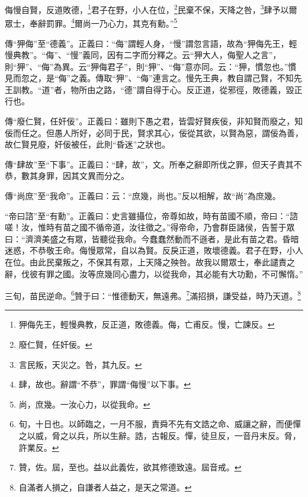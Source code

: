 侮慢自賢，反道敗德，\footnote{狎侮先王，輕慢典教，反正道，敗德義。侮，亡甫反。慢，亡諫反。}君子在野，小人在位，\footnote{廢仁賢，任奸佞。}民棄不保，天降之咎，\footnote{言民叛，天災之。咎，其九反。}肆予以爾眾士，奉辭罰罪。\footnote{肆，故也。辭謂“不恭”，罪謂“侮慢”以下事。}爾尚一乃心力，其克有勳。”\footnote{尚，庶幾。一汝心力，以從我命。}

{\noindent\zhuan{}\fzbyks 傳“狎侮”至“德義”。正義曰：“侮”謂輕人身，“慢”謂忽言語，故為“狎侮先王，輕慢典教”。“侮”、“慢”義同，因有二字而分釋之。云“狎大人，侮聖人之言”，則“狎”、“侮”為異。云“狎侮君子”，則“狎”、“侮”意亦同。云：“狎，慣忽也。”慣見而忽之，是“侮”之義。傳取“狎”、“侮”連言之。慢先王典，教自謂己賢，不知先王訓教。“道”者，物所由之路，“德”謂自得于心。反正道，從邪徑，敗德義，毀正行也。 \par}

{\noindent\zhuan{}\fzbyks 傳“廢仁賢，任奸佞”。正義曰：雖則下愚之君，皆雲好賢疾佞，非知賢而廢之，知佞而任之。但愚人所好，必同于民，賢求其心，佞從其欲，以賢為惡，謂佞為善，故仁賢見廢，奸佞被任，此則“昏迷”之狀也。 \par}

{\noindent\zhuan{}\fzbyks 傳“肆故”至“下事”。正義曰：“肆，故”，文。所奉之辭即所伐之罪，但天子責其不恭，數其身罪，因其文異而分之。 \par}

{\noindent\zhuan{}\fzbyks 傳“尚庶”至“我命”。正義曰：云：“庶幾，尚也。”反以相解，故“尚”為庶幾。 \par}

{\noindent\shu{}\fzkt “帝曰諮”至“有勳”。正義曰：史言雖攝位，帝尊如故，時有苗國不順，帝曰：“諮嗟！汝，惟時有苗之國不循帝道，汝往徵之。”得帝命，乃會群臣諸侯，告誓于眾曰：“濟濟美盛之有眾，皆聽從我命。今蠢蠢然動而不遜者，是此有苗之君。昏暗迷惑，不恭敬王命。侮慢眾常，自以為賢。反戾正道，敗壞德義。君子在野，小人在位。由此民棄叛之，不保其有眾，上天降之殃咎。故我以爾眾士，奉此譴責之辭，伐彼有罪之國。汝等庶幾同心盡力，以從我命，其必能有大功勳，不可懈惰。” \par}

三旬，苗民逆命。\footnote{旬，十日也。以師臨之，一月不服，責舜不先有文誥之命、威讓之辭，而便憚之以威，脅之以兵，所以生辭。誥，古報反。憚，徒旦反，一音丹末反。脅，許業反。}贊于曰：“惟德動天，無遠弗。\footnote{贊，佐。屆，至也。益以此義佐，欲其修德致遠。屆音戒。}滿招損，謙受益，時乃天道。\footnote{自滿者人損之，自謙者人益之，是天之常道。}


